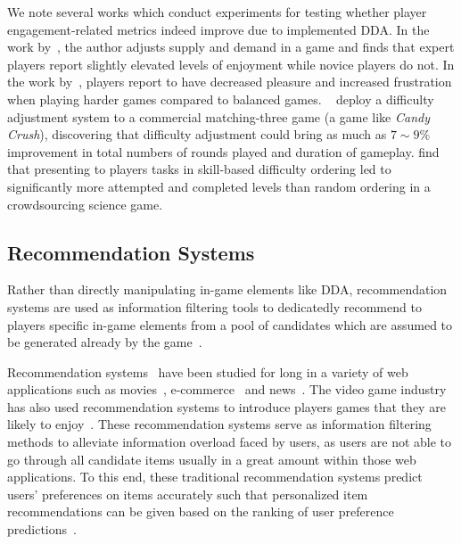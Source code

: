 We note several works which conduct experiments for testing whether player engagement-related metrics indeed improve due to implemented DDA. In the work by~\cite{hunicke2005case}, the author adjusts supply and demand in a game and finds that expert players report slightly elevated levels of enjoyment while novice players do not. In the work by~\cite{van2009incongruity}, players report to have decreased pleasure and increased frustration when playing harder games compared to balanced games. ~\cite{xue2017dynamic} deploy a difficulty adjustment system to a commercial matching-three game (a game like \textit{Candy Crush}), discovering that difficulty adjustment could bring as much as $7 \sim 9 \%$ improvement in total numbers of rounds played and duration of gameplay. \cite{sarkar2017engagement} find that presenting to players 
tasks in skill-based difficulty ordering led to significantly more attempted and completed levels than random ordering in a crowdsourcing science game. 


\subsection{Recommendation Systems}
Rather than directly manipulating in-game elements like DDA, recommendation systems are used as information filtering tools to dedicatedly recommend to players specific in-game elements from a pool of candidates which are assumed to be generated already by the game~\cite{medler2011using}.


Recommendation systems~\cite{isinkaye2015recommendation,bobadilla2013recommender,resnick1997recommender,adomavicius2005toward} have been studied for long in a variety of web applications such as movies~\cite{amatriain2012netflix}, e-commerce~\cite{linden2003amazon} and news~\cite{das2007google}. The video game industry has also used recommendation systems to introduce players games that they are likely to enjoy~\cite{sifa2014archetypal,orland10,skocir2012mars,wu2017recommendation}. These recommendation systems serve as information filtering methods to alleviate information overload faced by users, as users are not able to go through all candidate items usually in a great amount within those web applications. To this end, these traditional recommendation systems predict users' preferences on items accurately such that personalized item recommendations can be given based on the ranking of user preference predictions~\cite{liang2006personalized}. 

